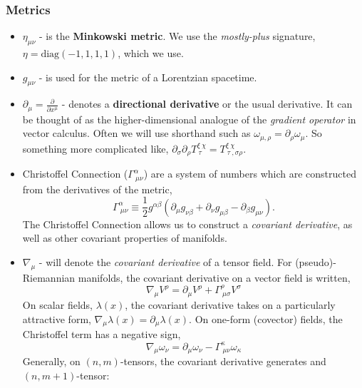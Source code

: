 \subsubsection{Metrics}
\begin{itemize}
    \item $\eta_{\mu\nu}$ - is the \textbf{Minkowski metric}. We use the \textit{mostly-plus} signature, $\eta = \text{diag}(-1, 1, 1, 1)$, which we use.
    \item $g_{\mu\nu}$ - is used for the metric of a Lorentzian spacetime.
    \item $\partial_{\mu} = \frac{\partial}{\partial x^{\mu}}$ - denotes a \textbf{directional derivative} or the usual derivative. It can be thought of as the higher-dimensional analogue of the \textit{gradient operator} in vector calculus. Often we will use shorthand such as $\omega_{\mu,\rho}=\partial_{\rho}\omega_{\mu}$. So something more complicated like, $\partial_{\sigma}\partial_{\rho}T^{\xi\ \chi}_{\ \tau} = T^{\xi\ \chi}_{\ \tau \ ,\sigma\rho}$.
    \item Christoffel Connection ($\Gamma^{\alpha}_{\ \mu\nu}$) are a system of numbers which are constructed from the derivatives of the metric,
    \begin{equation}
    \Gamma^{\alpha}_{\ \mu\nu}\equiv\frac{1}{2}g^{\alpha\beta}\left(\partial_{\mu}g_{\nu\beta}+\partial_{\nu}g_{\mu\beta} - \partial_{\beta}g_{\mu\nu}\right).
    \end{equation}
    The Christoffel Connection allows us to construct a \textit{covariant derivative}, as well as other covariant properties of manifolds. 
    \item $\nabla_{\mu}$ -  will denote the \textit{covariant derivative} of a tensor field. For (pseudo)-Riemannian manifolds, the covariant derivative on a vector field is written, 
    \begin{equation}
        \nabla_{\mu}V^{\rho} = \partial_{\mu}V^{\rho} + \Gamma^{\rho}_{\ \mu \sigma}V^{\sigma}
    \end{equation}
    On scalar fields, $\lambda(x)$, the covariant derivative takes on a particularly attractive form, $\nabla_{\mu}\lambda(x) = \partial_{\mu}\lambda(x)$.
    On one-form (covector) fields, the Christoffel term has a negative sign,
    \begin{equation}
        \nabla_{\mu}\omega_{\nu} = \partial_{\mu}\omega_{\nu} - \Gamma^{\kappa}_{\ \mu \nu}\omega_{\kappa}
    \end{equation}
    Generally, on $(n,m)$-tensors, the covariant derivative generates and $(n,m+1)$-tensor:

\end{itemize}
